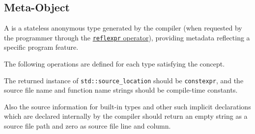\subsection{Meta-Object}
\label{concept-Meta-Object}

A  is a stateless anonymous type generated by the compiler
(when requested by the programmer through the 
\hyperref[section-reflection-operator]{\texttt{reflexpr} operator}),
providing metadata reflecting a specific program feature.





The following operations are defined for each type satisfying the 
concept.



The returned instance of \texttt{std::source\_location} should be \texttt{constexpr},
and the source file name and function name strings should be compile-time constants.

Also the source information for built-in types and other
such implicit declarations which are declared internally by the compiler
should return an empty string as a source file path and zero as source file
line and column.
